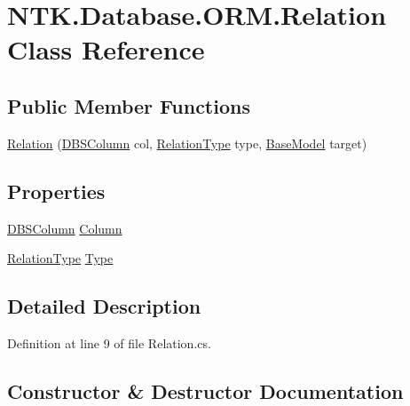 \hypertarget{class_n_t_k_1_1_database_1_1_o_r_m_1_1_relation}{}\section{N\+T\+K.\+Database.\+O\+R\+M.\+Relation Class Reference}
\label{class_n_t_k_1_1_database_1_1_o_r_m_1_1_relation}
\subsection*{Public Member Functions}
\begin{DoxyCompactItemize}
\item 
\mbox{\hyperlink{class_n_t_k_1_1_database_1_1_o_r_m_1_1_relation_a885d012c9e0ebff80d1ca9e5979dafcb}{Relation}} (\mbox{\hyperlink{class_n_t_k_1_1_database_1_1_d_b_s_column}{D\+B\+S\+Column}} col, \mbox{\hyperlink{namespace_n_t_k_1_1_database_1_1_o_r_m_a97fa169056f48b09978f26a00ef4151b}{Relation\+Type}} type, \mbox{\hyperlink{class_n_t_k_1_1_database_1_1_o_r_m_1_1_base_model}{Base\+Model}} target)
\end{DoxyCompactItemize}
\subsection*{Properties}
\begin{DoxyCompactItemize}
\item 
\mbox{\hyperlink{class_n_t_k_1_1_database_1_1_d_b_s_column}{D\+B\+S\+Column}} \mbox{\hyperlink{class_n_t_k_1_1_database_1_1_o_r_m_1_1_relation_a822e2e262a0d1bb83a36a22a226deacc}{Column}}
\item 
\mbox{\hyperlink{namespace_n_t_k_1_1_database_1_1_o_r_m_a97fa169056f48b09978f26a00ef4151b}{Relation\+Type}} \mbox{\hyperlink{class_n_t_k_1_1_database_1_1_o_r_m_1_1_relation_a6ce8784f33051e366390d72aa43c809a}{Type}}
\end{DoxyCompactItemize}


\subsection{Detailed Description}


Definition at line 9 of file Relation.\+cs.



\subsection{Constructor \& Destructor Documentation}
\mbox{\label{class_n_t_k_1_1_database_1_1_o_r_m_1_1_relation_a885d012c9e0ebff80d1ca9e5979dafcb}} 
